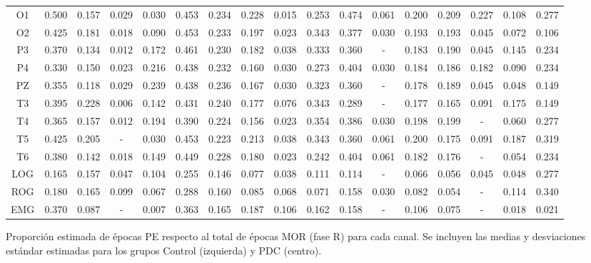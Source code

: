\begin{SidewaysFigure}
\begin{tabular}{c||ccccc|cc||cccc|cc||ccc}
 O1 & 0.500    & 0.157    & 0.029    & 0.030    & 0.453    & 0.234    & 0.228    & 0.015    & 0.253    & 0.474    & 0.061    & 0.200    & 0.209    & 0.227    & 0.108    & 0.277     \\
 O2 & 0.425    & 0.181    & 0.018    & 0.090    & 0.453    & 0.233    & 0.197    & 0.023    & 0.343    & 0.377    & 0.030    & 0.193    & 0.193    & 0.045    & 0.072    & 0.106     \\
 P3 & 0.370    & 0.134    & 0.012    & 0.172    & 0.461    & 0.230    & 0.182    & 0.038    & 0.333    & 0.360    & -      & 0.183    & 0.190    & 0.045    & 0.145    & 0.234     \\
 P4 & 0.330    & 0.150    & 0.023    & 0.216    & 0.438    & 0.232    & 0.160    & 0.030    & 0.273    & 0.404    & 0.030    & 0.184    & 0.186    & 0.182    & 0.090    & 0.234     \\
 PZ & 0.355    & 0.118    & 0.029    & 0.239    & 0.438    & 0.236    & 0.167    & 0.030    & 0.323    & 0.360    & -      & 0.178    & 0.189    & 0.045    & 0.048    & 0.149     \\
 T3 & 0.395    & 0.228    & 0.006    & 0.142    & 0.431    & 0.240    & 0.177    & 0.076    & 0.343    & 0.289    & -      & 0.177    & 0.165    & 0.091    & 0.175    & 0.149     \\
 T4 & 0.365    & 0.157    & 0.012    & 0.194    & 0.390    & 0.224    & 0.156    & 0.023    & 0.354    & 0.386    & 0.030    & 0.198    & 0.199    & -      & 0.060    & 0.277     \\
 T5 & 0.425    & 0.205    & -      & 0.030    & 0.453    & 0.223    & 0.213    & 0.038    & 0.343    & 0.360    & 0.061    & 0.200    & 0.175    & 0.091    & 0.187    & 0.319     \\
 T6 & 0.380    & 0.142    & 0.018    & 0.149    & 0.449    & 0.228    & 0.180    & 0.023    & 0.242    & 0.404    & 0.061    & 0.182    & 0.176    & -      & 0.054    & 0.234     \\
 LOG & 0.165    & 0.157    & 0.047    & 0.104    & 0.255    & 0.146    & 0.077    & 0.038    & 0.111    & 0.114    & -      & 0.066    & 0.056    & 0.045    & 0.048    & 0.277     \\
 ROG & 0.180    & 0.165    & 0.099    & 0.067    & 0.288    & 0.160    & 0.085    & 0.068    & 0.071    & 0.158    & 0.030    & 0.082    & 0.054    & -      & 0.114    & 0.340     \\
 EMG & 0.370    & 0.087    & -      & 0.007    & 0.363    & 0.165    & 0.187    & 0.106    & 0.162    & 0.158    & -      & 0.106    & 0.075    & -      & 0.018    & 0.021    
\end{tabular}
\caption{Proporci\'on estimada de \'epocas PE respecto al total de \'epocas MOR 
(fase R) para cada
canal. Se incluyen las medias y desviaciones est\'andar estimadas para los grupos 
Control (izquierda) y PDC (centro).}
\label{gpos_mor}
\end{SidewaysFigure}

